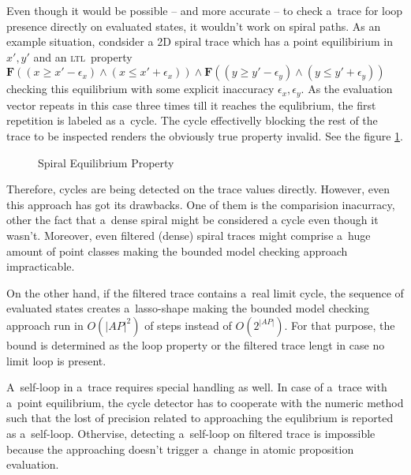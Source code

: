 \documentclass[12pt,oneside,draft]{fithesis}
\newcommand{\ltl}{\textsc{ltl}~}
\newcommand{\bF}{\mathbf{F}}
\begin{document}
Even though it would be possible -- and more accurate -- to check
a~trace for loop presence directly on evaluated states, it wouldn't
work on spiral paths. As an example situation, condsider a 2D spiral
trace which has a point equilibirium in $x',y'$ and an \ltl property
$\bF((x\ge x'-\epsilon_x)\wedge(x\le x'+\epsilon_x))\wedge
\bF((y\ge y'-\epsilon_y)\wedge(y\le y'+\epsilon_y))$ checking this
equilibrium with some explicit inaccuracy $\epsilon_x,\epsilon_y$.
As the evaluation vector repeats in this case three times till
it reaches the equlibrium, the first repetition is labeled as a~cycle.
The cycle effectivelly blocking the rest of the trace to be inspected
renders the obviously true property invalid. See the
figure \ref{spiral}.
\begin{figure}

\caption{Spiral Equilibrium Property}
\label{spiral}
\end{figure}
Therefore, cycles are being detected on the trace values directly.
However, even this approach has got its drawbacks. One of them
is the comparision inacurracy, other the fact that a~dense spiral might
be considered a cycle even though it wasn't. Moreover, even filtered
(dense) spiral traces might comprise a~huge amount of point classes
making the bounded model checking approach impracticable.

On the other hand, if the filtered trace contains a~real limit cycle,
the sequence of evaluated states creates a~lasso-shape making the
bounded model checking approach run in $O(|AP|^2)$ of steps
instead of $O(2^{|AP|})$\cite{biere}. For that purpose, the bound is
determined as the loop property or the filtered trace lengt in case
no limit loop is present.

A~self-loop in a~trace requires special handling as well. In case of
a~trace with a~point equilibrium, the cycle detector has to cooperate
with the numeric method such that the lost of precision related to
approaching the equlibrium is reported as a~self-loop. Othervise,
detecting a~self-loop on filtered trace is impossible because the
approaching doesn't trigger a~change in atomic proposition evaluation. 
\end{document}
